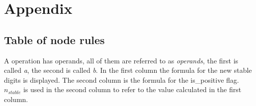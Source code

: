 \chapter{Appendix}

\section{Table of node rules}

\label{table_of_rules}

A operation has operands, all of them are referred to as \textit{operands}, the first is called \textit{a}, the second is called \textit{b}. In the first column the formula for the new stable digits is displayed. The second column is the formula for the is\_positive flag. $n_{stable}$ is used in the second column to refer to the value calculated in the first column.


